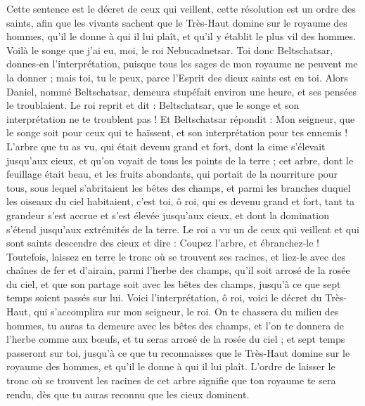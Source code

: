 \begin{multicols}{2}
Cette sentence est le décret de ceux qui veillent, cette résolution est un ordre des saints, afin que les vivants sachent que le Très-Haut domine sur le royaume des hommes, qu'il le donne à qui il lui plaît, et qu'il y établit le plus vil des hommes.
Voilà le songe que j'ai eu, moi, le roi Nebucadnetsar. Toi donc Beltschatsar, donnes-en l'interprétation, puisque tous les sages de mon royaume ne peuvent me la donner ; mais toi, tu le peux, parce l'Esprit des dieux saints est en toi.
Alors Daniel, nommé Beltschatsar, demeura stupéfait environ une heure, et ses pensées le troublaient. Le roi reprit et dit : Beltschatsar, que le songe et son interprétation ne te troublent pas ! Et Beltschatsar répondit : Mon seigneur, que le songe soit pour ceux qui te haïssent, et son interprétation pour tes ennemis !
L'arbre que tu as vu, qui était devenu grand et fort, dont la cime s'élevait jusqu'aux cieux, et qu'on voyait de tous les points de la terre ;
cet arbre, dont le feuillage était beau, et les fruits abondants, qui portait de la nourriture pour tous, sous lequel s'abritaient les bêtes des champs, et parmi les branches duquel les oiseaux du ciel habitaient,
c'est toi, ô roi, qui es devenu grand et fort, tant ta grandeur s'est accrue et s'est élevée jusqu'aux cieux, et dont la domination s'étend jusqu'aux extrémités de la terre.
Le roi a vu un de ceux qui veillent et qui sont saints descendre des cieux et dire : Coupez l'arbre, et ébranchez-le ! Toutefois, laissez en terre le tronc où se trouvent ses racines, et liez-le avec des chaînes de fer et d'airain, parmi l'herbe des champs, qu'il soit arrosé de la rosée du ciel, et que son partage soit avec les bêtes des champs, jusqu'à ce que sept temps soient passés sur lui.
Voici l'interprétation, ô roi, voici le décret du Très-Haut, qui s'accomplira sur mon seigneur, le roi.
On te chassera du milieu des hommes, tu auras ta demeure avec les bêtes des champs, et l'on te donnera de l'herbe comme aux bœufs, et tu seras arrosé de la rosée du ciel ; et sept temps passeront sur toi, jusqu'à ce que tu reconnaisses que le Très-Haut domine sur le royaume des hommes, et qu'il le donne à qui il lui plaît.
L'ordre de laisser le tronc où se trouvent les racines de cet arbre signifie que ton royaume te sera rendu, dès que tu auras reconnu que les cieux dominent.

\end{multicols}
